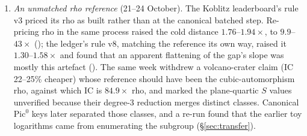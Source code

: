 \begin{enumerate}
\item \emph{An unmatched rho reference} (21--24 October). The Koblitz
  leaderboard's rule v3 priced its rho as built rather than at the canonical
  batched step. Re-pricing rho in the same process raised the cold distance
  $1.76$--$1.94\times$, to $9.9$--$43\times$
  (); the ledger's rule v8,
  matching the reference its own way, raised it $1.30$--$1.58\times$ and found
  that an apparent flattening of the gap's slope was mostly this artefact
  (). The same week withdrew a
  volcano-crater claim (IC 22--25\% cheaper) whose reference should have been
  the cubic-automorphism rho, against which IC is $84.9\times$ rho, and marked
  the plane-quartic $S$ values unverified because their degree-3 reduction
  merges distinct classes. Canonical $\mathrm{Pic}^0$ keys later separated
  those classes, and a re-run found that the earlier toy logarithms came from
  enumerating the subgroup (\S\ref{sec:transfer}).
\end{enumerate}
